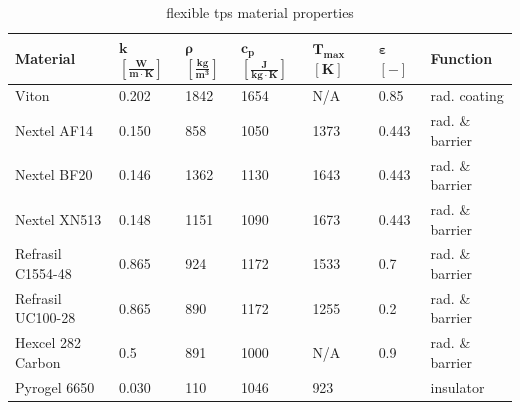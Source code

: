 \begin{table}[ht]
	\caption {flexible \acrfull{tps} material properties}
	\centering
	\begin{tabular}{|l|l|l|l|l|l|l|}
		\hline
		\textbf{Material}         & \textbf{ $\mathbf{k}$ $\mathbf{\left[\frac{W}{m\cdot K}\right]} $} & \textbf{ $\mathbf{ \rho }$ $\mathbf{ \left[ \frac{kg}{m^3} \right] }$} & \textbf{  $\mathbf{ c_{p} }$ $\mathbf{ \left[ \frac{J}{kg \cdot K} \right] }$ }& \textbf{ $\mathbf{ T_{max} }$ $\mathbf{ [ K ] }$} &\textbf{ $\mathbf{ \varepsilon }$ $\mathbf{ [ - ] }$} & \textbf{Function} \\[1.6ex]   \hline \hline
		Viton       & 0.202 & 1842 & 1654 & N/A	 & 0.85 & rad. coating
		\\ \hline
		Nextel AF14       & 0.150                                                 & 858                                        & 1050                                            & 1373	 & 0.443    & rad. \& barrier                                 \\ \hline
		Nextel BF20       & 0.146 
		& 1362                                        & 1130 
		& 1643	 & 0.443  & rad. \& barrier                                  
		\\ \hline
		Nextel XN513      & 0.148                                                 & 1151                                       & 1090                                            & 1673	 & 0.443           & rad. \& barrier                               \\ \hline
		Refrasil C1554-48 & 0.865                                                 & 924                                        & 1172                                            & 1533	 & 0.7     & rad. \& barrier                                       \\ \hline
		Refrasil UC100-28 & 0.865                                                 & 890                                        & 1172                                            & 1255  & 0.2       & rad. \& barrier                                    \\ \hline
		Hexcel 282 Carbon & 0.5                                                   & 891                                        & 1000                                            & N/A 	 & 0.9      & rad. \& barrier \\ \hline
		Pyrogel 6650      & 0.030                                                 & 110                                        & 1046                                            & 923    & ~        & insulator                                  \\ \hline

\end{tabular}
\end{table}

